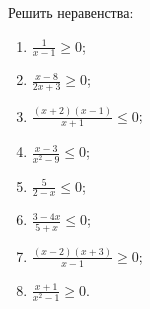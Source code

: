 \documentclass[algebra,twocolumn]{pum}
\begin{document}
\begin{exercises}
  Решить неравенства:
  \begin{question}
    \vspace{-24pt}
    \begin{multicols}{2}
      \begin{enumerate}
        \item $\frac{1}{x-1}\ge0$;
        \item $\frac{x-8}{2x+3}\ge0$;
        \item $\frac{(x+2)(x-1)}{x+1}\le0$;
        \item $\frac{x-3}{x^2-9}\le0$;
        \item $\frac{5}{2-x}\le0$;
        \item $\frac{3-4x}{5+x}\le0$;
        \item $\frac{(x-2)(x+3)}{x-1}\ge0$;
        \item $\frac{x+1}{x^2-1}\ge0$.
      \end{enumerate}
    \end{multicols}
  \end{question}
\end{exercises}
\end{document}
